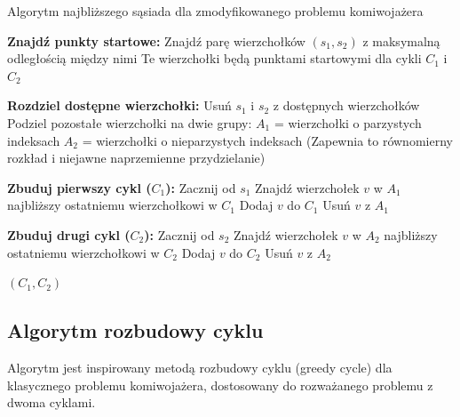 \documentclass[12pt,a4paper]{article}
\begin{document}
\begin{algorithm}
\caption{Algorytm najbliższego sąsiada dla zmodyfikowanego problemu komiwojażera}
\begin{algorithmic}[1]
\State \textbf{Znajdź punkty startowe:}
\State Znajdź parę wierzchołków $(s_1, s_2)$ z maksymalną odległością między nimi
\State Te wierzchołki będą punktami startowymi dla cykli $C_1$ i $C_2$

\State \textbf{Rozdziel dostępne wierzchołki:}
\State Usuń $s_1$ i $s_2$ z dostępnych wierzchołków
\State Podziel pozostałe wierzchołki na dwie grupy:
\State $A_1$ = wierzchołki o parzystych indeksach
\State $A_2$ = wierzchołki o nieparzystych indeksach
\State (Zapewnia to równomierny rozkład i niejawne naprzemienne przydzielanie)

\State \textbf{Zbuduj pierwszy cykl ($C_1$):}
\State Zacznij od $s_1$
    \State Znajdź wierzchołek $v$ w $A_1$ najbliższy ostatniemu wierzchołkowi w $C_1$
    \State Dodaj $v$ do $C_1$
    \State Usuń $v$ z $A_1$
\EndWhile

\State \textbf{Zbuduj drugi cykl ($C_2$):}
\State Zacznij od $s_2$
    \State Znajdź wierzchołek $v$ w $A_2$ najbliższy ostatniemu wierzchołkowi w $C_2$
    \State Dodaj $v$ do $C_2$
    \State Usuń $v$ z $A_2$
\EndWhile

\State \Return $(C_1, C_2)$
\end{algorithmic}
\end{algorithm}

\subsection{Algorytm rozbudowy cyklu}
Algorytm jest inspirowany metodą rozbudowy cyklu (greedy cycle) dla klasycznego problemu komiwojażera, dostosowany do rozważanego problemu z dwoma cyklami.
\end{document}
